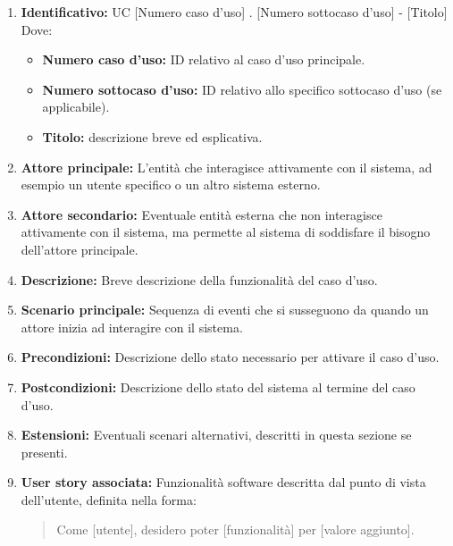 \begin{enumerate}
    \item \textbf{Identificativo:} UC [Numero caso d’uso] . [Numero sottocaso d’uso] - [Titolo]\\
    \medskip Dove:
    \begin{itemize}
        \item \textbf{Numero caso d’uso:} ID relativo al caso d'uso principale.
        \item \textbf{Numero sottocaso d’uso:} ID relativo allo specifico sottocaso d'uso (se applicabile).
        \item \textbf{Titolo:} descrizione breve ed esplicativa.
    \end{itemize}

    \item \textbf{Attore principale:} L'entità che interagisce attivamente con il sistema, ad esempio un utente specifico o un altro sistema esterno.

    \item \textbf{Attore secondario:} Eventuale entità esterna che non interagisce attivamente con il sistema, ma permette al sistema di soddisfare il bisogno dell’attore principale.

    \item \textbf{Descrizione:} Breve descrizione della funzionalità del caso d’uso.

    \item \textbf{Scenario principale:} Sequenza di eventi che si susseguono da quando un attore inizia ad interagire con il sistema.

    \item \textbf{Precondizioni:} Descrizione dello stato necessario per attivare il caso d’uso.

    \item \textbf{Postcondizioni:} Descrizione dello stato del sistema al termine del caso d’uso.

    \item \textbf{Estensioni:} Eventuali scenari alternativi, descritti in questa sezione se presenti.

    \item \textbf{User story associata:} Funzionalità software descritta dal punto di vista dell'utente, definita nella forma:
    \begin{quote}
        Come [utente], desidero poter [funzionalità] per [valore aggiunto].
    \end{quote}
\end{enumerate}

